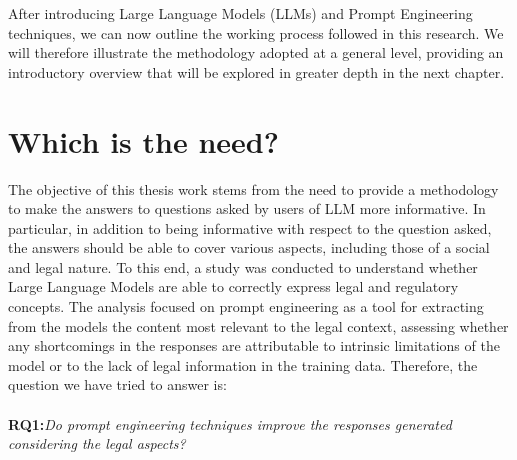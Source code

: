 
After introducing Large Language Models (LLMs) and Prompt Engineering techniques, we can now outline the working process followed in this research. We will therefore illustrate the methodology adopted at a general level, providing an introductory overview that will be explored in greater depth in the next chapter.
\section{Which is the need?}
The objective of this thesis work stems from the need to provide a methodology to make the answers to questions asked by users of LLM more informative. In particular, in addition to being informative with respect to the question asked, the answers should be able to cover various aspects, including those of a social and legal nature.
To this end, a study was conducted to understand whether Large Language Models are able to correctly express legal and regulatory concepts. The analysis focused on prompt engineering as a tool for extracting from the models the content most relevant to the legal context, assessing whether any shortcomings in the responses are attributable to intrinsic limitations of the model or to the lack of legal information in the training data.
Therefore, the question we have tried to answer is:\\
\\
\textbf{RQ1:}\textit{Do prompt engineering techniques improve the responses generated considering the legal aspects?}\\
